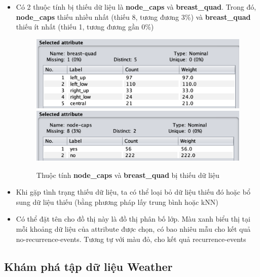 \documentclass[a4paper, 12pt]{article}
\begin{document}
\begin{itemize}
\begin{itemize}
        \item Có 2 thuộc tính bị thiếu dữ liệu là \textbf{node\_caps} và \textbf{breast\_quad}. Trong đó, \textbf{node\_caps} thiếu nhiều nhất (thiếu 8, tương đương 3\%) và \textbf{breast\_quad} thiếu ít nhất (thiếu 1, tương đương gần 0\%)
        \begin{figure}[H]
            \begin{center}
                \includegraphics[scale = 0.65]{images/breast_quad_missingData.png}
                \includegraphics[scale = 0.65]{images/node_caps_missingData.png}
                \caption{Thuộc tính \textbf{node\_caps} và \textbf{breast\_quad} bị thiếu dữ liệu}
            \end{center}
        \end{figure}

        \item Khi gặp tình trạng thiếu dữ liệu, ta có thể loại bỏ dữ liệu thiếu đó hoặc bổ sung dữ liệu thiếu (bằng phương pháp lấy trung bình hoặc kNN)
        \item Có thể đặt tên cho đồ thị này là đồ thị phân bố lớp. Màu xanh biểu thị tại mỗi khoảng dữ liệu của attribute được chọn, có bao nhiêu mẫu cho kết quả no-recurrence-events. Tương tự với màu đỏ, cho kết quả recurrence-events
    \end{itemize}
\end{itemize}

\subsection{Khám phá tập dữ liệu Weather}
\end{document}
